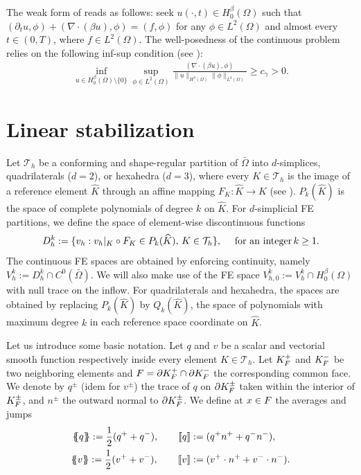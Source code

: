 The weak form of  reads as follows: seek $u(\cdot,t) \in H_0^\beta(\Omega)$ such that $(\partial_t u,\phi) +   (\nabla \cdot (\beta u),\phi) = (f,\phi)$ for any $\phi \in L^2(\Omega)$ and almost every $t \in (0,T)$, where  $f \in L^2(\Omega)$. The well-posedness of the continuous problem relies on the following inf-sup condition (see \cite{guermond_stabilization_1999}):
\begin{align}\label{eq-infsup}
\inf_{u \in H_0^\beta (\Omega)\setminus\{0\}} \sup_{\phi \in L^2(\Omega)} \frac{(\nabla \cdot (\beta u),\phi) }{\|u\|_{H^\beta (\Omega)} \|\phi\|_{L^2(\Omega)}} \geq c_{\gamma} > 0.
\end{align}

\section{Linear stabilization}\label{s-fem}
%
Let $\mathcal{T}_h$ be a conforming and shape-regular partition of $\bar \Omega$ into $d$-simplices, quadrilaterals ($d=2$), or hexahedra ($d=3$), where every $K \in \mathcal{T}_h$ is the image of a reference element $\widehat{K}$ through an affine mapping $F_K: \widehat K \rightarrow K$ (see \cite[Chp. 2]{ciarlet_finite_2002}). %
$P_k(\widehat K)$ is the space of complete polynomials of degree $k$ on $\widehat K$. For $d$-simplicial FE partitions, we define the space of element-wise discontinuous functions
$$
D_{h}^k := \{ v_h: v_h|_K \circ F_K \in P_k(\widehat K), \,{K} \in \mathcal{T}_h\}, \quad \hbox{ for an integer}\, k\geq 1. 
$$
The continuous FE spaces are obtained by enforcing continuity, namely $V_h^k := D_h^k \cap C^0(\bar \Omega)$. We will also make use of the FE space  $V^k_{h,0} := V^k_h \cap H_0^\beta(\Omega)$ with null trace on the inflow. For quadrilaterals and hexahedra, the spaces are obtained by replacing $P_k(\widehat K)$ by $Q_k(\widehat K)$, the space of polynomials with maximum degree $k$ in each reference space coordinate on $\widehat K$.  

Let us introduce some basic notation. Let  $q$ and $v$  be a scalar and vectorial smooth function respectively inside every element $K \in \mathcal{T}_h$. Let $K^+_F$ and $K^-_F$ be two neighboring elements and $F = \partial K^+_F \cap \partial K^-_F$ the corresponding common face. We denote by $q^\pm$ (idem for $v^\pm$) the trace of $q$ on $\partial K^\pm_F$ taken within the interior of $K^\pm_F$, and $n^\pm$ the outward normal to $\partial K^\pm_F$. We define at $x \in F$ the averages and jumps 
\begin{align*}
\mean{q} := \half(q^+ + q^-),\qquad \jump{q} &:=(q^+  n^+ + q^- n^-),\\
\mean{v} := \half(v^+ + v^-) ,\qquad \jump{v} &:= (v^+ \cdot n^+ + v^- \cdot n^-).
\end{align*}


